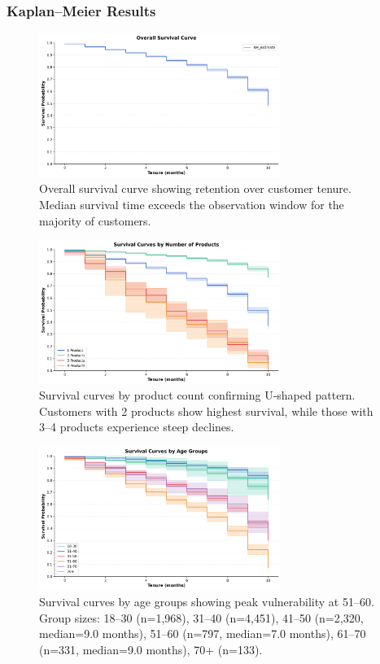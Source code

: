 \documentclass[12pt]{article}
\begin{document}
\subsubsection{Kaplan–Meier Results}
\begin{figure}[H]
\centering
\includegraphics[width=0.7\textwidth]{img/09_overall_survival_curve_plot.png}
\caption{Overall survival curve showing retention over customer tenure. Median survival time exceeds the observation window for the majority of customers.}
\label{fig:survival_overall}
\end{figure}

\begin{figure}[H]
\centering
\includegraphics[width=0.7\textwidth]{img/11_survival_products_plot.png}
\caption{Survival curves by product count confirming U‑shaped pattern. Customers with 2 products show highest survival, while those with 3–4 products experience steep declines.}
\label{fig:survival_products}
\end{figure}

\begin{figure}[H]
\centering
\includegraphics[width=0.7\textwidth]{img/10_survival_age_groups_plot.png}
\caption{Survival curves by age groups showing peak vulnerability at 51–60. Group sizes: 18–30 (n=1,968), 31–40 (n=4,451), 41–50 (n=2,320, median=9.0 months), 51–60 (n=797, median=7.0 months), 61–70 (n=331, median=9.0 months), 70+ (n=133).}
\label{fig:survival_age}
\end{figure}
\end{document}
